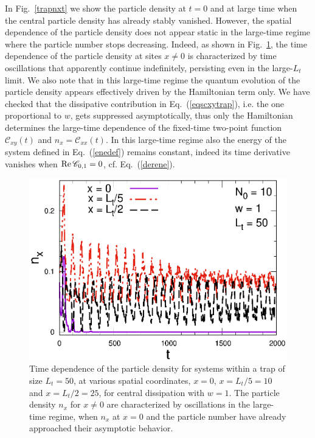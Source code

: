   In Fig.~\ref{trapnxt} we show the particle density at $t=0$ and at
  large time when the central particle density has already stably
  vanished. However, the spatial dependence of the particle density does
  not appear static in the large-time regime where the particle number
  stops decreasing. Indeed, as shown in Fig.~\ref{trapnxto}, the time
  dependence of the particle density at sites $x\neq 0$ is characterized
  by time oscillations that apparently continue indefinitely, persisting
  even in the large-$L_t$ limit.  We also note that in this large-time
  regime the quantum evolution of the particle density appears
  effectively driven by the Hamiltonian term only. We have checked that
  the dissipative contribution in Eq.~(\ref{eqscxytrap}), i.e. the one
  proportional to $w$, gets suppressed asymptotically, thus only the
  Hamiltonian determines the large-time dependence of the fixed-time
  two-point function ${\mathscr C}_{xy}(t)$ and $n_x={\mathscr
    C}_{xx}(t)$. In this large-time regime also the energy of the system
  defined in Eq.~(\ref{enedef}) remains constant, indeed its time
  derivative vanishes when ${\rm Re}\,{\mathscr C}_{0,1}=0$,
  cf. Eq.~(\ref{derene}).
  
  
  
  
  
  
  \begin{figure}[!htb]
\centering
  \includegraphics[width=0.65\columnwidth]{imm/nxtLt50.eps}
  \caption{ Time dependence of the particle density for systems within a
    trap of size $L_t=50$, at various spatial coordinates, $x=0$,
    $x=L_t/5=10$ and $x=L_t/2=25$, for central dissipation with $w=1$.
    The particle density $n_x$ for $x\neq 0$ are characterized by
    oscillations in the large-time regime, when $n_x$ at $x=0$ and the
    particle number have already approached their asymptotic behavior.
  }
  \label{trapnxto}
  \end{figure}
  
